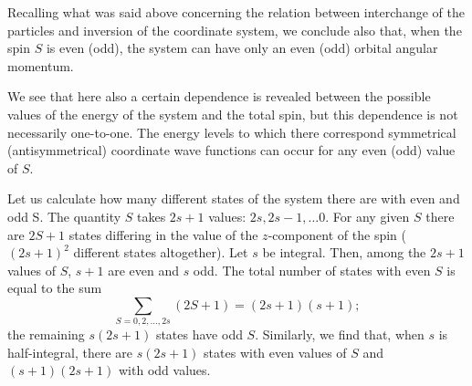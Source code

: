 Recalling what was said above concerning the relation between interchange of the particles and inversion of the coordinate system, we conclude also that, when the spin $ S $ is even (odd), the system can have only an even (odd) orbital angular momentum.

We see that here also a certain dependence is revealed between the possible values of the energy of the system and the total spin, but this dependence is not necessarily one-to-one. The energy levels to which there correspond symmetrical (antisymmetrical) coordinate wave functions can occur for any even (odd) value of $ S $.

Let us calculate how many different states of the system there are with even and odd S. The quantity $ S $ takes $ 2s + 1 $ values: $ 2s, 2s - 1, \dots 0 $. For any given $ S $ there are $ 2S + 1 $ states differing in the value of the $ z $-component of the spin ($ (2s+1)^2 $ different states altogether). Let $ s $ be integral. Then, among the $ 2s + 1 $ values of $ S $, $ s + 1 $ are even and $ s $ odd. The total number of states with even $ S $ is equal to the sum
\[ \sum_{S=0,2,\dots,2s}(2S+1)=(2s+1)(s+1); \]
the remaining $ s (2s+1) $ states have odd $ S $. Similarly, we find that, when $ s $ is half-integral, there are $ s (2s+1) $ states with even values of $ S $ and $ (s+1)(2s+1) $ with odd values.





